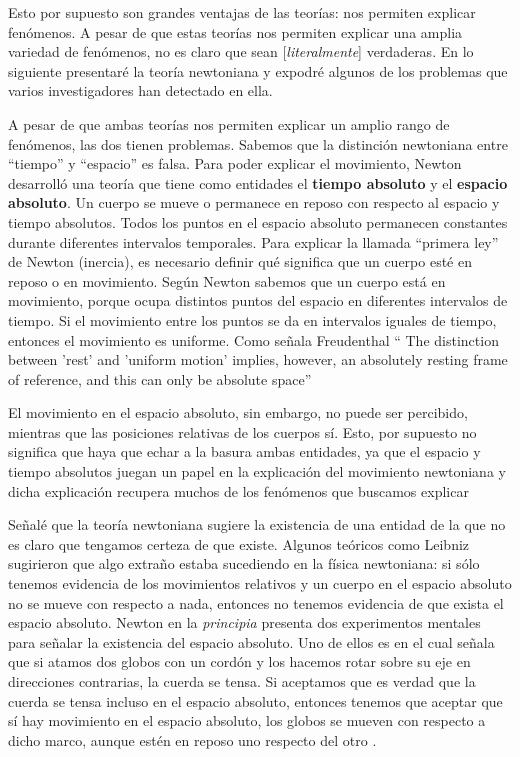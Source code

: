 \documentclass{article}
\begin{document}
Esto por supuesto son grandes ventajas de las teorías: nos permiten explicar fenómenos. A pesar de que estas teorías nos permiten explicar una amplia variedad de fenómenos, no es claro que sean [\textit{literalmente}] verdaderas. En lo siguiente presentaré la teoría newtoniana y expodré algunos de los problemas que varios investigadores han detectado en ella.

A pesar de que ambas teorías nos permiten explicar un amplio rango de fenómenos, las dos tienen problemas. Sabemos que la distinción newtoniana entre ``tiempo'' y ``espacio'' es falsa. Para poder explicar el movimiento, Newton desarrolló una teoría que tiene como entidades el \textbf{tiempo absoluto} y el \textbf{espacio absoluto}. Un cuerpo se mueve o permanece en reposo con respecto al espacio y tiempo absolutos. Todos los puntos en el espacio absoluto permanecen constantes durante diferentes intervalos temporales. Para explicar la llamada ``primera ley''  de Newton (inercia), es necesario definir qué significa que un cuerpo esté en reposo o en movimiento. Según Newton sabemos que un cuerpo está en movimiento, porque ocupa distintos puntos del espacio en diferentes intervalos de tiempo. Si el movimiento entre los puntos se da en intervalos iguales de tiempo, entonces el movimiento es uniforme. Como señala Freudenthal `` The distinction between 'rest' and 'uniform motion' implies, however, an absolutely resting frame of reference, and this can only be absolute space'' \citeyear{Freudenthal1986}

El movimiento en el espacio absoluto, sin embargo, no puede ser percibido, mientras que las posiciones relativas de los cuerpos sí. Esto, por supuesto no significa que haya que echar a la basura ambas entidades, ya que el espacio y tiempo absolutos juegan un papel en la explicación del movimiento newtoniana y dicha explicación recupera muchos de los fenómenos que buscamos explicar 

Señalé que la teoría newtoniana sugiere la existencia de una entidad de la que no es claro que tengamos certeza de que existe. Algunos teóricos como Leibniz sugirieron que algo extraño estaba sucediendo en la física newtoniana: si sólo tenemos evidencia de los movimientos relativos y un cuerpo en el espacio absoluto no se mueve con respecto a nada, entonces no tenemos evidencia de que exista el espacio absoluto. Newton en la \textit{principia} presenta dos experimentos mentales para señalar la existencia del espacio absoluto. Uno de ellos es en el cual señala que si atamos dos globos con un cordón y los hacemos rotar sobre su eje en direcciones contrarias, la cuerda se tensa. Si aceptamos que es verdad que la cuerda se tensa incluso en el espacio absoluto, entonces tenemos que aceptar que sí hay movimiento en el espacio absoluto, los globos se mueven con respecto a dicho marco, aunque estén en reposo uno respecto del otro \cite[pp. 6-12]{book:360820}.
\end{document}
